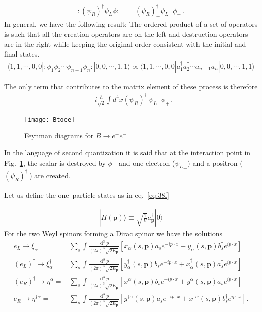 \begin{align}
:(\psi_R)^{\dagger}{\psi_L}\phi: =&(\psi_R)^{\dagger}_{-}{\psi_L}_{-}\phi_{+}\,.
\end{align}
In general, we have the following result: The ordered product of a set of operators is such that all the creation operators are on the left and destruction operators are in the right while keeping the original order consistent with the initial and final states.
\begin{align}
\langle 1,1,\cdots,0,0|  :\phi_1 \phi_2 \cdots \phi_{n-1}\phi_n:|0,0,\cdots,1,1\rangle
\propto \langle 1,1,\cdots,0,0| a_1^{\dagger} a_2^{\dagger}\cdots a_{n-1}a_n|0,0,\cdots,1,1\rangle
\end{align}


The only term that contributes to the matrix element of these process is therefore
\begin{align}
  \label{eq:97f}
  -i \frac{h}{\sqrt{2}} \int d^4x(\psi_R)^{\dagger}_-{\psi_L}_-\phi_+\,.
\end{align}

\begin{figure} %
  \centering %
  \texttt{[image: Btoee]} %
  \caption{Feynman diagrams for $B\to e^+ e^-$} %
  \label{fig:btoee} %
\end{figure} %
In the language of second quantization it is said that at the interaction point in Fig.~\ref{fig:btoee}, the scalar is destroyed by $\phi_+$ and one electron (${\psi_L}_-$) and a positron ($(\psi_R)^{\dagger}_{-}$) are created.

Let us define the one--particle states as in eq.~\eqref{eq:38f}

\begin{align}
  | H(\mathbf{p})\rangle\equiv\sqrt{\frac{1}{V}}a^\dagger_{\mathbf{p}}|0\rangle 
\end{align}
For the two Weyl spinors forming a Dirac spinor we have the solutions
\begin{align}
 e_L\to \xi_{\alpha}=&\sum_s\int \frac{\operatorname{d}^3p}{(2\pi)^3\sqrt{2E_{\mathbf{p}}}} \left[ x_{\alpha}\left(s,\mathbf{p}\right) a_s e^{-i p\cdot x}+y_{\alpha}\left(s,\mathbf{p}\right) b_s^{\dagger} e^{i p\cdot x}  \right]\nonumber\\
 \left( e_L \right)^{\dagger}\to \xi_{\dot{\alpha}}^{\dagger}=&\sum_s\int \frac{\operatorname{d}^3p}{(2\pi)^3\sqrt{2E_{\mathbf{p}}}} \left[ y_{\dot{\alpha}}^{\dagger}\left(s,\mathbf{p}\right) b_s e^{-i p\cdot x}+x_{\dot{\alpha}}^{\dagger}\left(s,\mathbf{p}\right) a_s^{\dagger} e^{i p\cdot x}  \right]\nonumber\\
 \left( e_R \right)^{\dagger}\to \eta^{\alpha}=&\sum_s\int \frac{\operatorname{d}^3p}{(2\pi)^3\sqrt{2E_{\mathbf{p}}}} \left[ x^{\alpha}\left(s,\mathbf{p}\right) b_s e^{-i p\cdot x}+y^{\alpha}\left(s,\mathbf{p}\right) a_s^{\dagger} e^{i p\cdot x}  \right] \nonumber\\
  e_R\to \eta^{\dagger\dot{\alpha}}=&\sum_s\int \frac{\operatorname{d}^3p}{(2\pi)^3\sqrt{2E_{\mathbf{p}}}} \left[ y^{\dagger\dot{\alpha}}\left(s,\mathbf{p}\right) a_s e^{-i p\cdot x}+x^{\dagger\dot{\alpha}}\left(s,\mathbf{p}\right) b_s^{\dagger} e^{i p\cdot x}  \right].
\end{align}


